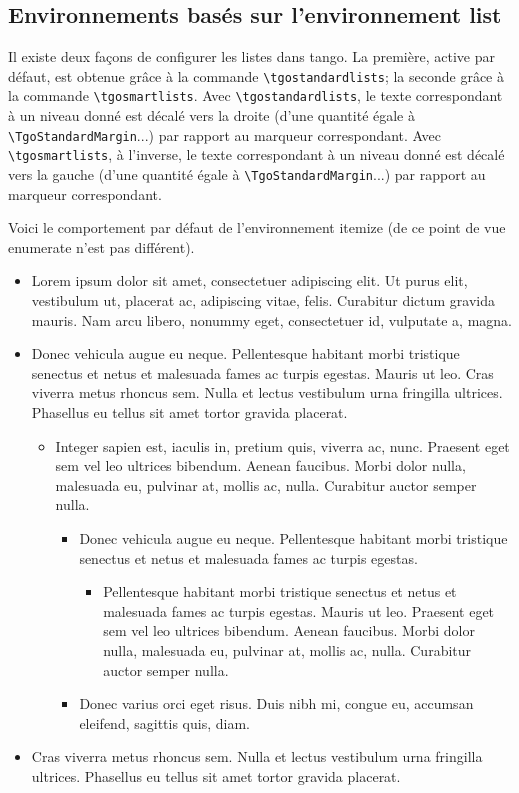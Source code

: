 \documentclass[french,ColorTheme=USAF,FontSize=10pt]{tango}
\newcommand\TO[1]{\textsf{#1}}
\begin{document}
\subsection{Environnements basés sur l'environnement list}
Il existe deux façons de configurer les listes dans tango. La première, active par défaut, est obtenue grâce à la commande \verb+\tgostandardlists+; la seconde grâce à la commande \verb+\tgosmartlists+.
%
Avec \verb+\tgostandardlists+, le texte correspondant à un niveau donné est décalé vers la droite (d'une quantité égale à  \verb+\TgoStandardMargin+...) par rapport au marqueur correspondant.
%
Avec \verb+\tgosmartlists+, à l'inverse, le texte correspondant à un niveau donné est décalé vers la gauche (d'une quantité égale à  \verb+\TgoStandardMargin+...) par rapport au marqueur correspondant.
\renewtgolabels*\tgostandardlists

Voici le comportement par défaut de l'environnement \TO{itemize} (de ce point de vue \TO{enumerate} n'est pas différent).
\begin{itemize}
\item Lorem ipsum dolor sit amet, consectetuer adipiscing elit. Ut purus elit, vestibulum ut, placerat ac, adipiscing vitae, felis. Curabitur dictum gravida mauris. Nam arcu libero, nonummy eget, consectetuer id, vulputate a, magna.
\item Donec vehicula augue eu neque. Pellentesque habitant morbi tristique senectus et netus et malesuada fames ac turpis egestas. Mauris ut leo. Cras viverra metus rhoncus sem. Nulla et lectus vestibulum urna fringilla ultrices. Phasellus eu tellus sit amet tortor gravida placerat.
\begin{itemize}
\item Integer sapien est, iaculis in, pretium quis, viverra ac, nunc. Praesent eget sem vel leo ultrices bibendum. Aenean faucibus. Morbi dolor nulla, malesuada eu, pulvinar at, mollis ac, nulla. Curabitur auctor semper nulla.
\begin{itemize}
\item Donec vehicula augue eu neque. Pellentesque habitant morbi tristique senectus et netus et malesuada fames ac turpis egestas.
\begin{itemize}
\item Pellentesque habitant morbi tristique senectus et netus et malesuada fames ac turpis egestas. Mauris ut leo. Praesent eget sem vel leo ultrices bibendum. Aenean faucibus. Morbi dolor nulla, malesuada eu, pulvinar at, mollis ac, nulla. Curabitur auctor semper nulla.
\end{itemize}
\item Donec varius orci eget risus. Duis nibh mi, congue eu, accumsan eleifend, sagittis quis, diam. 
\end{itemize}\end{itemize}
\item  Cras viverra metus rhoncus sem. Nulla et lectus vestibulum urna fringilla ultrices. Phasellus eu tellus sit amet tortor gravida placerat.
\end{itemize}
\end{document}
